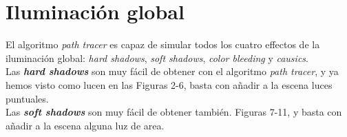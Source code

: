 \documentclass{article}
\begin{document}
\newpage

\section{Iluminación global}

El algoritmo \textit{path tracer} es capaz de simular todos los cuatro effectos
de la iluminación global: \textit{hard shadows}, \textit{soft shadows},
\textit{color bleeding} y \textit{causics}. \\

Las \textbf{\textit{hard shadows}} son muy fácil de obtener con el algoritmo
\textit{path tracer}, y ya hemos visto como lucen en las Figuras 2-6, basta con
añadir a la escena luces puntuales. \\

Las \textbf{\textit{soft shadows}} son muy fácil de obtener también. Figuras
7-11, y basta con añadir a la escena alguna luz de area. \\
\end{document}

